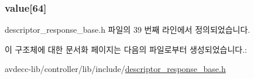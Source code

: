 \subsubsection[{\texorpdfstring{value}{value}}]{ value\mbox{[}64\mbox{]}}\hypertarget{structavdecc__lib_1_1avdecc__lib__name__string64_a7968db9d35aabae83b5c038723160e28}{}\label{structavdecc__lib_1_1avdecc__lib__name__string64_a7968db9d35aabae83b5c038723160e28}


descriptor\+\_\+response\+\_\+base.\+h 파일의 39 번째 라인에서 정의되었습니다.



이 구조체에 대한 문서화 페이지는 다음의 파일로부터 생성되었습니다.\+:\begin{DoxyCompactItemize}
\item 
avdecc-\/lib/controller/lib/include/\hyperlink{descriptor__response__base_8h}{descriptor\+\_\+response\+\_\+base.\+h}\end{DoxyCompactItemize}
